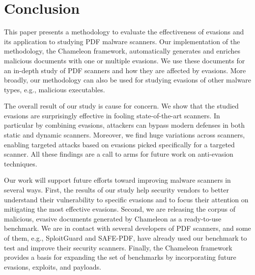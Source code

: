 \section{Conclusion}
\label{ss: conclusion}

This paper presents a methodology to evaluate the effectiveness of evasions and its application to studying PDF malware scanners.
Our implementation of the methodology, the Chameleon framework, automatically generates and enriches malicious documents with one or multiple evasions.
We use these documents for an in-depth study of \nbAnalyzers{} PDF scanners and how they are affected by evasions.
More broadly, our methodology can also be used for studying evasions of other malware types, e.g., malicious executables.

The overall result of our study is cause for concern.
We show that the studied evasions are surprisingly effective in fooling state-of-the-art scanners.
In particular by combining evasions, attackers can bypass modern defenses in both static and dynamic scanners.
Moreover, we find huge variations across scanners, enabling targeted attacks based on evasions picked specifically for a targeted scanner.
All these findings are a call to arms for future work on anti-evasion techniques.

Our work will support future efforts toward improving malware scanners in several ways.
First, the results of our study help security vendors to better understand their vulnerability to specific evasions and to focus their attention on mitigating the most effective evasions.
Second, we are releasing the corpus of malicious, evasive documents generated by Chameleon as a ready-to-use benchmark.
We are in contact with several developers of PDF scanners, and some of them, e.g., SploitGuard and SAFE-PDF, have already used our benchmark to test and improve their security scanners.
Finally, the Chameleon framework provides a basis for expanding the set of benchmarks by incorporating future evasions, exploits, and payloads.
